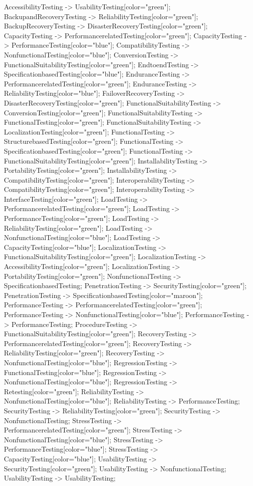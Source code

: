 \documentclass{article}
\begin{document}
{AccessibilityTesting -> UsabilityTesting[color="green"];
BackupandRecoveryTesting -> ReliabilityTesting[color="green"];
BackupRecoveryTesting -> DisasterRecoveryTesting[color="green"];
CapacityTesting -> PerformancerelatedTesting[color="green"];
CapacityTesting -> PerformanceTesting[color="blue"];
CompatibilityTesting -> NonfunctionalTesting[color="blue"];
ConversionTesting -> FunctionalSuitabilityTesting[color="green"];
EndtoendTesting -> SpecificationbasedTesting[color="blue"];
EnduranceTesting -> PerformancerelatedTesting[color="green"];
EnduranceTesting -> ReliabilityTesting[color="blue"];
FailoverRecoveryTesting -> DisasterRecoveryTesting[color="green"];
FunctionalSuitabilityTesting -> ConversionTesting[color="green"];
FunctionalSuitabilityTesting -> FunctionalTesting[color="green"];
FunctionalSuitabilityTesting -> LocalizationTesting[color="green"];
FunctionalTesting -> StructurebasedTesting[color="green"];
FunctionalTesting -> SpecificationbasedTesting[color="green"];
FunctionalTesting -> FunctionalSuitabilityTesting[color="green"];
InstallabilityTesting -> PortabilityTesting[color="green"];
InstallabilityTesting -> CompatibilityTesting[color="green"];
InteroperabilityTesting -> CompatibilityTesting[color="green"];
InteroperabilityTesting -> InterfaceTesting[color="green"];
LoadTesting -> PerformancerelatedTesting[color="green"];
LoadTesting -> PerformanceTesting[color="green"];
LoadTesting -> ReliabilityTesting[color="green"];
LoadTesting -> NonfunctionalTesting[color="blue"];
LoadTesting -> CapacityTesting[color="blue"];
LocalizationTesting -> FunctionalSuitabilityTesting[color="green"];
LocalizationTesting -> AccessibilityTesting[color="green"];
LocalizationTesting -> PortabilityTesting[color="green"];
NonfunctionalTesting -> SpecificationbasedTesting;
PenetrationTesting -> SecurityTesting[color="green"];
PenetrationTesting -> SpecificationbasedTesting[color="maroon"];
PerformanceTesting -> PerformancerelatedTesting[color="green"];
PerformanceTesting -> NonfunctionalTesting[color="blue"];
PerformanceTesting -> PerformanceTesting;
ProcedureTesting -> FunctionalSuitabilityTesting[color="green"];
RecoveryTesting -> PerformancerelatedTesting[color="green"];
RecoveryTesting -> ReliabilityTesting[color="green"];
RecoveryTesting -> NonfunctionalTesting[color="blue"];
RegressionTesting -> FunctionalTesting[color="blue"];
RegressionTesting -> NonfunctionalTesting[color="blue"];
RegressionTesting -> Retesting[color="green"];
ReliabilityTesting -> NonfunctionalTesting[color="blue"];
ReliabilityTesting -> PerformanceTesting;
SecurityTesting -> ReliabilityTesting[color="green"];
SecurityTesting -> NonfunctionalTesting;
StressTesting -> PerformancerelatedTesting[color="green"];
StressTesting -> NonfunctionalTesting[color="blue"];
StressTesting -> PerformanceTesting[color="blue"];
StressTesting -> CapacityTesting[color="blue"];
UsabilityTesting -> SecurityTesting[color="green"];
UsabilityTesting -> NonfunctionalTesting;
UsabilityTesting -> UsabilityTesting;

}
\end{document}
